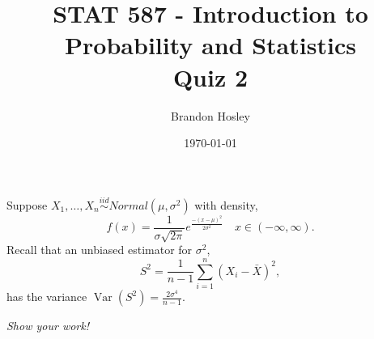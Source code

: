 \documentclass[answers]{exam}
\title{STAT 587 - Introduction to Probability and Statistics%
	\\ Quiz 2}
\author{Brandon Hosley}
\date{\today}
\begin{document}
\maketitle
\begin{questions}

\question 
Suppose \(X_1,\ldots,X_n \overset{iid}{\sim} Normal(\mu,\sigma^2)\) with density,
\[
f(x) =\frac{1}{\sigma\sqrt{2\pi}}e^{\frac{-(x-\mu)^2}{2\sigma^2}} 
\quad x\in(-\infty,\infty).
\]
Recall that an unbiased estimator for \(\sigma^2\),
\[
S^2 = \frac{1}{n-1}\sum_{i=1}^{n}(X_i-\bar{X})^2,
\]
has the variance \(\operatorname{Var}(S^2) = \frac{2\sigma^4}{n-1}\).
\textit{Show your work!}

\begin{solution}
\begin{parts}

\end{parts}
\end{solution}
\end{questions}
\end{document}
